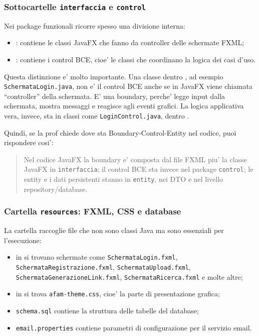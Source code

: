 ﻿\documentclass[11pt,a4paper]{article}
\begin{document}
\subsubsection{Sottocartelle \texttt{interfaccia} e \texttt{control}}

Nei package funzionali ricorre spesso una divisione interna:
\begin{itemize}
  \item {}: contiene le classi JavaFX che fanno da controller delle
  schermate FXML;
  \item {}: contiene i control BCE, cioe' le classi che coordinano la logica
  dei casi d'uso.
\end{itemize}

Questa distinzione e' molto importante. Una classe dentro , ad esempio
\texttt{SchermataLogin.java}, non e' il control BCE anche se in JavaFX viene chiamata
``controller'' della schermata. E' una boundary, perche' legge input dalla schermata,
mostra messaggi e reagisce agli eventi grafici. La logica applicativa vera, invece, sta in
classi come \texttt{LoginControl.java}, dentro .

Quindi, se la prof chiede dove sta Boundary-Control-Entity nel codice, puoi rispondere
cosi':
\begin{quote}
Nel codice JavaFX la boundary e' composta dal file FXML piu' la classe JavaFX in
\texttt{interfaccia}; il control BCE sta invece nel package \texttt{control}; le entity e
i dati persistenti stanno in \texttt{entity}, nei DTO e nel livello repository/database.
\end{quote}

\subsubsection{Cartella \texttt{resources}: FXML, CSS e database}

La cartella  raccoglie file che non sono classi Java ma sono
essenziali per l'esecuzione:
\begin{itemize}
  \item in  si trovano schermate come \texttt{SchermataLogin.fxml},
  \texttt{SchermataRegistrazione.fxml}, \texttt{SchermataUpload.fxml},
  \texttt{SchermataGenerazioneLink.fxml}, \texttt{SchermataRicerca.fxml} e molte altre;
  \item in  si trova \texttt{afam-theme.css}, cioe' la parte di presentazione
  grafica;
  \item \texttt{schema.sql} contiene la struttura delle tabelle del database;
  \item \texttt{email.properties} contiene parametri di configurazione per il servizio
  email.
\end{itemize}
\end{document}
